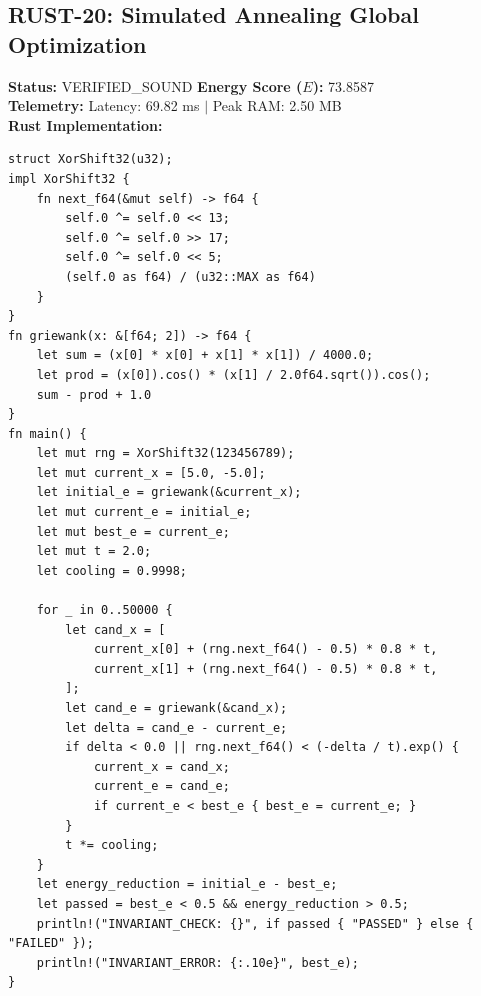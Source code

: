 \documentclass[11pt, a4paper]{article}
\begin{document}
\subsection{RUST-20: Simulated Annealing Global Optimization}
\textbf{Status:} VERIFIED\_SOUND \hfill \textbf{Energy Score ($E$):} 73.8587\\
\textbf{Telemetry:} Latency: 69.82 ms $|$ Peak RAM: 2.50 MB\\
\textbf{Rust Implementation:}
\begin{verbatim}
struct XorShift32(u32);
impl XorShift32 {
    fn next_f64(&mut self) -> f64 {
        self.0 ^= self.0 << 13;
        self.0 ^= self.0 >> 17;
        self.0 ^= self.0 << 5;
        (self.0 as f64) / (u32::MAX as f64)
    }
}
fn griewank(x: &[f64; 2]) -> f64 {
    let sum = (x[0] * x[0] + x[1] * x[1]) / 4000.0;
    let prod = (x[0]).cos() * (x[1] / 2.0f64.sqrt()).cos();
    sum - prod + 1.0
}
fn main() {
    let mut rng = XorShift32(123456789);
    let mut current_x = [5.0, -5.0];
    let initial_e = griewank(&current_x);
    let mut current_e = initial_e;
    let mut best_e = current_e;
    let mut t = 2.0;
    let cooling = 0.9998;

    for _ in 0..50000 {
        let cand_x = [
            current_x[0] + (rng.next_f64() - 0.5) * 0.8 * t,
            current_x[1] + (rng.next_f64() - 0.5) * 0.8 * t,
        ];
        let cand_e = griewank(&cand_x);
        let delta = cand_e - current_e;
        if delta < 0.0 || rng.next_f64() < (-delta / t).exp() {
            current_x = cand_x;
            current_e = cand_e;
            if current_e < best_e { best_e = current_e; }
        }
        t *= cooling;
    }
    let energy_reduction = initial_e - best_e;
    let passed = best_e < 0.5 && energy_reduction > 0.5;
    println!("INVARIANT_CHECK: {}", if passed { "PASSED" } else { "FAILED" });
    println!("INVARIANT_ERROR: {:.10e}", best_e);
}
\end{verbatim}
\end{document}
